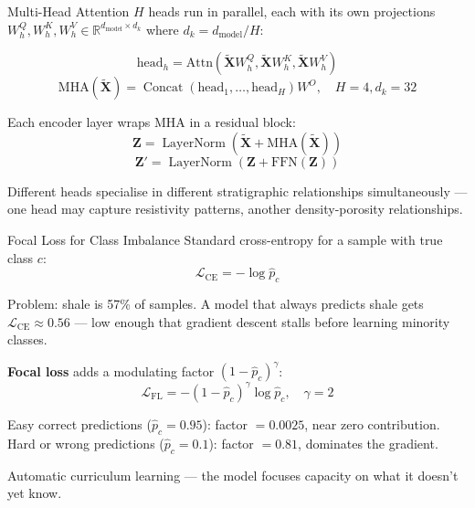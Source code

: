 \documentclass[aspectratio=169,11pt]{beamer}
\newcommand{\acc}[1]{{\color{Accent}#1}}
\newcommand{\mut}[1]{{\color{Muted}#1}}
\newcommand{\dmodel}{d_{\mathrm{model}}}
\newcommand{\dkey}{d_k}
\newcommand{\Concat}{\operatorname{Concat}}
\newcommand{\LayerNorm}{\operatorname{LayerNorm}}
\begin{document}
\begin{frame}{Multi-Head Attention}
  $H$ heads run in parallel, each with its own projections $W^Q_h, W^K_h, W^V_h \in \mathbb{R}^{\dmodel \times \dkey}$ where $\dkey = \dmodel / H$:

  \[
    \mathrm{head}_h = \mathrm{Attn}(\tilde{\mathbf{X}} W^Q_h, \tilde{\mathbf{X}} W^K_h, \tilde{\mathbf{X}} W^V_h)
  \]
  \[
    \mathrm{MHA}(\tilde{\mathbf{X}}) = \Concat(\mathrm{head}_1, \ldots, \mathrm{head}_H) W^O, \quad H=4, \dkey=32
  \]

  \vspace{0.6em}
  Each encoder layer wraps MHA in a residual block:
  \[
    \mathbf{Z} = \LayerNorm(\tilde{\mathbf{X}} + \mathrm{MHA}(\tilde{\mathbf{X}}))
  \]
  \[
    \mathbf{Z}' = \LayerNorm(\mathbf{Z} + \mathrm{FFN}(\mathbf{Z}))
  \]

  \vspace{0.6em}
  \mut{Different heads specialise in different stratigraphic relationships simultaneously — one head may capture resistivity patterns, another density-porosity relationships.}
\end{frame}

\begin{frame}{Focal Loss for Class Imbalance}
  Standard cross-entropy for a sample with true class $c$:
  \[
    \mathcal{L}_{\text{CE}} = -\log \hat{p}_c
  \]

  \vspace{0.4em}
  \acc{Problem:} shale is 57\% of samples. A model that always predicts shale gets $\mathcal{L}_{\text{CE}} \approx 0.56$ — low enough that gradient descent stalls before learning minority classes.

  \vspace{0.8em}
  \textbf{Focal loss} adds a modulating factor $(1 - \hat{p}_c)^\gamma$:
  \[
    \mathcal{L}_{\text{FL}} = -(1 - \hat{p}_c)^\gamma \log \hat{p}_c, \quad \gamma = 2
  \]

  \vspace{0.4em}
  Easy correct predictions ($\hat{p}_c = 0.95$): factor $= 0.0025$, near zero contribution. Hard or wrong predictions ($\hat{p}_c = 0.1$): factor $= 0.81$, dominates the gradient.

  \vspace{0.6em}
  \mut{Automatic curriculum learning — the model focuses capacity on what it doesn't yet know.}
\end{frame}
\end{document}
